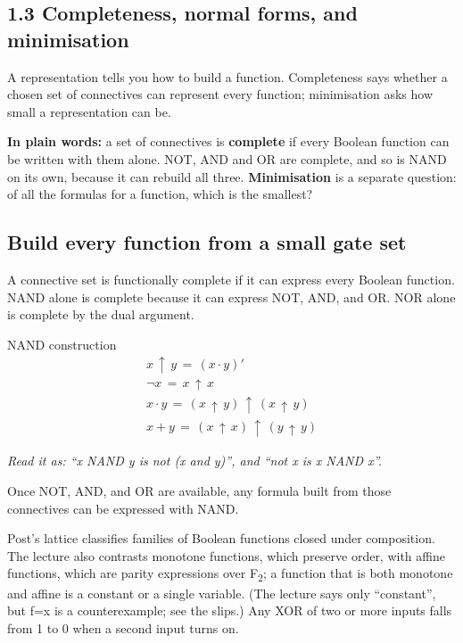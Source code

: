\documentclass[11pt]{article}
\begin{document}
\begin{keepsection}
\section{1.3 Completeness, normal forms, and minimisation}

A representation tells you how to build a function. Completeness says whether a chosen set of connectives can represent every function; minimisation asks how small a representation can be.

\begin{plainbox}\textbf{In plain words:} a set of connectives is \textbf{complete} if every Boolean function can be written with them alone. NOT, AND and OR are complete, and so is NAND on its own, because it can rebuild all three. \textbf{Minimisation} is a separate question: of all the formulas for a function, which is the smallest?\end{plainbox}

\begin{keepsection}
\subsection{Build every function from a small gate set}

A connective set is functionally complete if it can express every Boolean function. NAND alone is complete because it can express NOT, AND, and OR. NOR alone is complete by the dual argument.

\begin{equationcard}{NAND construction}
\[ \begin{gathered} {x}\, ↑\, {y}\, =\, ({x}\cdot {y})' \\ \neg {x}\, =\, {x}\, ↑\, {x} \\ {x}\cdot {y}\, =\, ({x}\, ↑\, {y})\, ↑\, ({x}\, ↑\, {y}) \\ {x}+{y}\, =\, ({x}\, ↑\, {x})\, ↑\, ({y}\, ↑\, {y}) \end{gathered} \]
{\small \emph{Read it as: “x NAND y is not (x and y)”, and “not x is x NAND x”.}\par Once NOT, AND, and OR are available, any formula built from those connectives can be expressed with NAND.}
\end{equationcard}

Post’s lattice classifies families of Boolean functions closed under composition. The lecture also contrasts monotone functions, which preserve order, with affine functions, which are parity expressions over F\textsubscript{2}; a function that is both monotone and affine is a constant or a single variable. (The lecture says only “constant”, but f=x is a counterexample; see the slips.) Any XOR of two or more inputs falls from 1 to 0 when a second input turns on.
\end{keepsection}


\end{keepsection}
\end{document}
